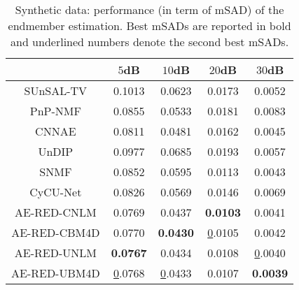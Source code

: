 \documentclass[journal,a4paper]{IEEEtran}
\begin{document}
\begin{table}[h]
\centering
\renewcommand\arraystretch{1.5}
\caption{Synthetic data: performance (in term of mSAD) of the endmember estimation. Best mSADs are reported in bold and underlined numbers denote the second best mSADs.}\label{Tab_syn_mSAD_results}
\begin{tabular}{c|c|c|c|c}
\hline\hline
            & $5$dB            & $10$dB           & $20$dB           & $30$dB           \\ \hline
SUnSAL-TV   & 0.1013          & 0.0623          & 0.0173          & 0.0052          \\ \hline
PnP-NMF     & 0.0855          & 0.0533          & 0.0181          & 0.0083          \\ \hline
CNNAE       & 0.0811          & 0.0481          & 0.0162          & 0.0045          \\ \hline
UnDIP       & 0.0977          & 0.0685          & 0.0193          & 0.0057          \\ \hline
SNMF        & 0.0852          & 0.0595          & 0.0113          & 0.0043          \\ \hline
CyCU-Net    & 0.0826          & 0.0569          & 0.0146          & 0.0069          \\ \hline
AE-RED-CNLM  & 0.0769          & 0.0437          & \textbf{0.0103} & 0.0041          \\ \hline
AE-RED-CBM4D & 0.0770          & \textbf{0.0430} & {\ul 0.0105}    & 0.0042          \\ \hline
AE-RED-UNLM  & \textbf{0.0767} & 0.0434          & 0.0108          & {\ul 0.0040}    \\ \hline
AE-RED-UBM4D & {\ul 0.0768}    & {\ul 0.0433}    & 0.0107          & \textbf{0.0039} \\ \hline\hline
\end{tabular}
\end{table}
\end{document}
